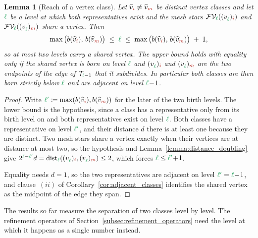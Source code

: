 \documentclass[a4paper, 12pt]{article}
\newcommand{\green}{\color{ForestGreen}}
\newcommand{\brickred}{\color{BrickRed}}
\newcommand{\T}{\mathcal{T}}
\newcommand{\V}{\mathcal{V}}
\newcommand{\F}{\mathcal{F}}
\newcommand{\vertex}[2]{\freeQ{v}{}{#1}{#2}}
\newcommand{\vertexClass}[1]{\widehat{v}_{#1}}
\newcommand{\FVl}[1]{\F\V_{#1}}
\newcommand{\dist}[1]{\operatorname{dist}_{#1}}
\newcommand{\coarseIdxone}{{\brickred i}}
\newcommand{\coarseIdxtwo}{{\brickred m}}
\renewcommand{\l}{{\green\ell}}
\newcommand{\lone}{{\green {\l'}  }}
\newcommand{\freeQ}[4]{ ( {#1}^{#2}_{#3} )_{#4}}
\newtheorem{lemma}[theorem]{Lemma}
\theoremstyle{definition}
\theoremstyle{plain}
\numberwithin{equation}{section}
\newcommand{\birthLevel}{b}
\begin{document}
\begin{lemma}[Reach of a vertex class]
    \label{lemma:class_reach}
    Let $\vertexClass{\coarseIdxone} \neq \vertexClass{\coarseIdxtwo}$ be distinct vertex classes and let $\l$ be a level at which both representatives exist and the mesh stars $\FVl{\l}(\vertex{\l}{\coarseIdxone})$ and $\FVl{\l}(\vertex{\l}{\coarseIdxtwo})$ share a vertex. Then
    \begin{equation}
        \label{eq:class_reach}
        \max \big( \birthLevel(\vertexClass{\coarseIdxone}), \, \birthLevel(\vertexClass{\coarseIdxtwo}) \big) \; \leq \; \l \; \leq \; \max \big( \birthLevel(\vertexClass{\coarseIdxone}), \, \birthLevel(\vertexClass{\coarseIdxtwo}) \big) \; + \; 1 ,
    \end{equation}
    so at most two levels carry a shared vertex. The upper bound holds with equality only if the shared vertex is born on level $\l$ and $\vertex{\l}{\coarseIdxone}$ and $\vertex{\l}{\coarseIdxtwo}$ are the two endpoints of the edge of $\T_{\l-1}$ that it subdivides. In particular both classes are then born strictly below $\l$ and are adjacent on level $\l \! - \! 1$.
\end{lemma}
\begin{proof}
    Write $\lone \coloneq \max ( \birthLevel(\vertexClass{\coarseIdxone}), \birthLevel(\vertexClass{\coarseIdxtwo}) )$ for the later of the two birth levels. The lower bound is the hypothesis, since a class has a representative only from its birth level on and both representatives exist on level $\l$. Both classes have a representative on level $\lone$, and their distance $d$ there is at least one because they are distinct. Two mesh stars share a vertex exactly when their vertices are at distance at most two, so the hypothesis and Lemma~\ref{lemma:distance_doubling} give $2^{\l - \lone} d = \dist{\l} ( \vertex{\l}{\coarseIdxone}, \vertex{\l}{\coarseIdxtwo} ) \leq 2$, which forces $\l \leq \lone \! + \! 1$.

    Equality needs $d = 1$, so the two representatives are adjacent on level $\lone = \l \! - \! 1$, and clause~$(ii)$ of Corollary~\ref{cor:adjacent_classes} identifies the shared vertex as the midpoint of the edge they span.
\end{proof}

The results so far measure the separation of two classes level by level. The refinement operators of Section~\ref{subsec:refinement_operators} need the level at which it happens as a single number instead.
\end{document}

